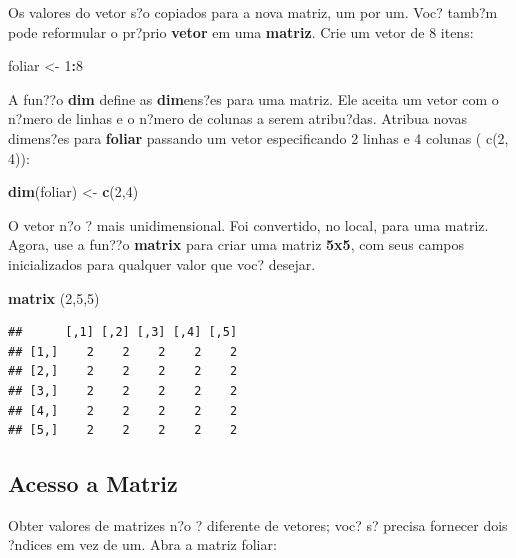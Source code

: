 \documentclass[]{book}
\newenvironment{Shaded}{\begin{snugshade}}{\end{snugshade}}
\newcommand{\DecValTok}[1]{\textcolor[rgb]{0.00,0.00,0.81}{#1}}
\newcommand{\KeywordTok}[1]{\textcolor[rgb]{0.13,0.29,0.53}{\textbf{#1}}}
\newcommand{\NormalTok}[1]{#1}
\newcommand{\OperatorTok}[1]{\textcolor[rgb]{0.81,0.36,0.00}{\textbf{#1}}}
\newcommand{\StringTok}[1]{\textcolor[rgb]{0.31,0.60,0.02}{#1}}
\begin{document}
Os valores do vetor s?o copiados para a nova matriz, um por um. Voc? tamb?m pode reformular o pr?prio \textbf{vetor} em uma \textbf{matriz}. Crie um vetor de 8 itens:

\begin{Shaded}
\begin{Highlighting}[]
\NormalTok{foliar <-}\StringTok{ }\DecValTok{1}\OperatorTok{:}\DecValTok{8}
\end{Highlighting}
\end{Shaded}

A fun??o \textbf{dim} define as \textbf{dim}ens?es para uma matriz. Ele aceita um vetor com o n?mero de linhas e o n?mero de colunas a serem atribu?das.
Atribua novas dimens?es para \textbf{foliar} passando um vetor especificando 2 linhas e 4 colunas ( c(2, 4)):

\begin{Shaded}
\begin{Highlighting}[]
\KeywordTok{dim}\NormalTok{(foliar) <-}\StringTok{ }\KeywordTok{c}\NormalTok{(}\DecValTok{2}\NormalTok{,}\DecValTok{4}\NormalTok{)}
\end{Highlighting}
\end{Shaded}

O vetor n?o ? mais unidimensional. Foi convertido, no local, para uma matriz.
Agora, use a fun??o \textbf{matrix} para criar uma matriz \textbf{5x5}, com seus campos inicializados para qualquer valor que voc? desejar.

\begin{Shaded}
\begin{Highlighting}[]
\KeywordTok{matrix}\NormalTok{ (}\DecValTok{2}\NormalTok{,}\DecValTok{5}\NormalTok{,}\DecValTok{5}\NormalTok{)}
\end{Highlighting}
\end{Shaded}

\begin{verbatim}
##      [,1] [,2] [,3] [,4] [,5]
## [1,]    2    2    2    2    2
## [2,]    2    2    2    2    2
## [3,]    2    2    2    2    2
## [4,]    2    2    2    2    2
## [5,]    2    2    2    2    2
\end{verbatim}

\hypertarget{acesso-a-matriz}{%
\subsection{Acesso a Matriz}\label{acesso-a-matriz}}

Obter valores de matrizes n?o ? diferente de vetores; voc? s? precisa fornecer dois ?ndices em vez de um. Abra a matriz foliar:
\end{document}
